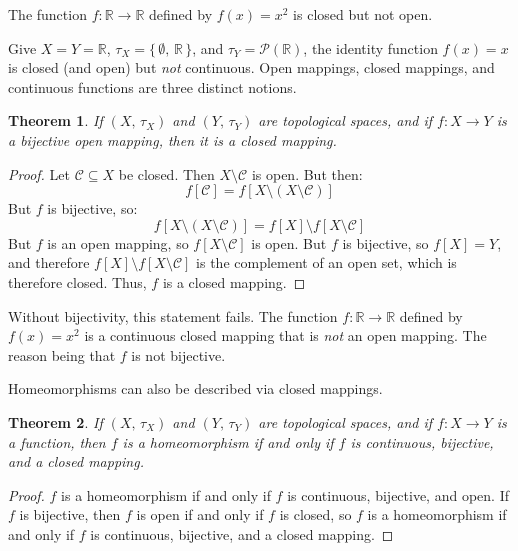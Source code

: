 \documentclass{article}
\theoremstyle{plain}
\newtheorem{theorem}{Theorem}[section]
\theoremstyle{normal}
\newenvironment{example}{%
    \pushQED{\qed}\renewcommand{\qedsymbol}{$\blacksquare$}\examplex%
}{%
    \popQED\endexamplex%
}
\begin{document}
        \begin{example}
            The function $f:\mathbb{R}\rightarrow\mathbb{R}$ defined by
            $f(x)=x^{2}$ is closed but not open.
        \end{example}
        \begin{example}
            Give $X=Y=\mathbb{R}$, $\tau_{X}=\{\,\emptyset,\,\mathbb{R}\,\}$,
            and $\tau_{Y}=\mathcal{P}(\mathbb{R})$, the identity function
            $f(x)=x$ is closed (and open) but \textit{not} continuous.
        \end{example}
        Open mappings, closed mappings, and continuous functions
        are three distinct notions.
        \begin{theorem}
            If $(X,\,\tau_{X})$ and $(Y,\,\tau_{Y})$ are topological spaces,
            and if $f:X\rightarrow{Y}$ is a bijective open mapping, then it is
            a closed mapping.
        \end{theorem}
        \begin{proof}
            Let $\mathcal{C}\subseteq{X}$ be closed. Then
            $X\setminus\mathcal{C}$ is open. But then:
            \begin{equation}
                f[\mathcal{C}]=
                f[X\setminus(X\setminus\mathcal{C})]
            \end{equation}
            But $f$ is bijective, so:
            \begin{equation}
                f[X\setminus(X\setminus\mathcal{C})]
                =f[X]\setminus{f}[X\setminus\mathcal{C}]
            \end{equation}
            But $f$ is an open mapping, so $f[X\setminus\mathcal{C}]$ is open.
            But $f$ is bijective, so $f[X]=Y$, and therefore
            $f[X]\setminus{f}[X\setminus\mathcal{C}]$ is the complement of an
            open set, which is therefore closed. Thus, $f$ is a closed mapping.
        \end{proof}
        Without bijectivity, this statement fails. The function
        $f:\mathbb{R}\rightarrow\mathbb{R}$ defined by $f(x)=x^{2}$ is a
        continuous closed mapping that is \textit{not} an open mapping. The
        reason being that $f$ is not bijective.
        \par\hfill\par
        Homeomorphisms can also be described via closed mappings.
        \begin{theorem}
            If $(X,\,\tau_{X})$ and $(Y,\,\tau_{Y})$ are topological spaces,
            and if $f:X\rightarrow{Y}$ is a function, then $f$ is a
            homeomorphism if and only if $f$ is continuous, bijective, and a
            closed mapping.
        \end{theorem}
        \begin{proof}
            $f$ is a homeomorphism if and only if $f$ is continuous, bijective,
            and open. If $f$ is bijective, then $f$ is open if and only if
            $f$ is closed, so $f$ is a homeomorphism if and only if $f$ is
            continuous, bijective, and a closed mapping. 
        \end{proof}
\end{document}

